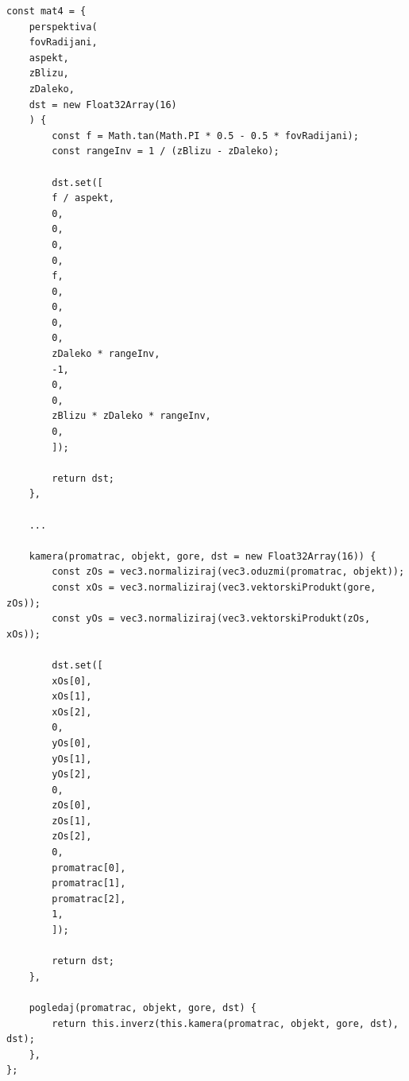 \documentclass{foi}
\begin{document}
\begin{verbatim}
const mat4 = {
	perspektiva(
	fovRadijani,
	aspekt,
	zBlizu,
	zDaleko,
	dst = new Float32Array(16)
	) {
		const f = Math.tan(Math.PI * 0.5 - 0.5 * fovRadijani);
		const rangeInv = 1 / (zBlizu - zDaleko);
		
		dst.set([
		f / aspekt,
		0,
		0,
		0,
		0,
		f,
		0,
		0,
		0,
		0,
		zDaleko * rangeInv,
		-1,
		0,
		0,
		zBlizu * zDaleko * rangeInv,
		0,
		]);
		
		return dst;
	},
	
	...
	
	kamera(promatrac, objekt, gore, dst = new Float32Array(16)) {
		const zOs = vec3.normaliziraj(vec3.oduzmi(promatrac, objekt));
		const xOs = vec3.normaliziraj(vec3.vektorskiProdukt(gore, zOs));
		const yOs = vec3.normaliziraj(vec3.vektorskiProdukt(zOs, xOs));
		
		dst.set([
		xOs[0],
		xOs[1],
		xOs[2],
		0,
		yOs[0],
		yOs[1],
		yOs[2],
		0,
		zOs[0],
		zOs[1],
		zOs[2],
		0,
		promatrac[0],
		promatrac[1],
		promatrac[2],
		1,
		]);
		
		return dst;
	},
	
	pogledaj(promatrac, objekt, gore, dst) {
		return this.inverz(this.kamera(promatrac, objekt, gore, dst), dst);
	},
};
\end{verbatim}
\end{document}
